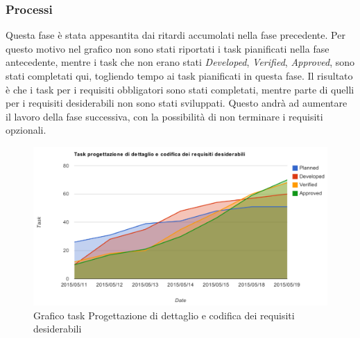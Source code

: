 \begin{description}
		\subsubsection{Processi}
		Questa fase è stata appesantita dai ritardi accumolati nella fase precedente. Per questo motivo nel grafico non sono stati riportati i task pianificati nella fase antecedente, mentre i task che non erano stati \textit{Developed}, \textit{Verified}, \textit{Approved}, sono stati completati qui, togliendo tempo ai task pianificati in questa fase. Il risultato è che i task per i requisiti obbligatori sono stati completati, mentre parte di quelli per i requisiti desiderabili non sono stati sviluppati. Questo andrà ad aumentare il lavoro della fase successiva, con la possibilità di non terminare i requisiti opzionali.
			\begin{figure}[htbp]
				\centering
				\centerline{\includegraphics[scale=0.6]{images/Grafico_fase_6.pdf}}
				\caption{Grafico task Progettazione di dettaglio e codifica dei requisiti desiderabili}
				\label{fig:taskfase6}
			\end{figure}
			

\end{description}
